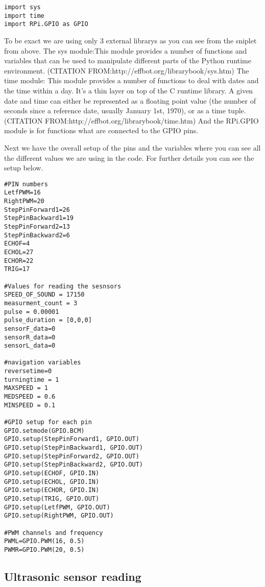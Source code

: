 \begin{lstlisting}
import sys
import time
import RPi.GPIO as GPIO
\end{lstlisting}

To be exact we are using only 3 external librarys as you can see from the sniplet from above.
The sys module:This module provides a number of functions and variables that can be used to manipulate different parts of the Python runtime environment.
(CITATION FROM:http://effbot.org/librarybook/sys.htm)
The time module: This module provides a number of functions to deal with dates and the time within a day. It’s a thin layer on top of the C runtime library.
A given date and time can either be represented as a floating point value (the number of seconds since a reference date, usually January 1st, 1970), or as a time tuple.
(CITATION FROM:http://effbot.org/librarybook/time.htm)
And the RPi.GPIO module is for functions what are connected to the GPIO pins.

Next we have the overall setup of the pins and the variables where you can see all the different values we are using in the code.
For further details you can see the setup below.

\begin{lstlisting}
#PIN numbers
LetfPWM=16
RightPWM=20
StepPinForward1=26
StepPinBackward1=19
StepPinForward2=13
StepPinBackward2=6
ECHOF=4
ECHOL=27
ECHOR=22
TRIG=17

#Values for reading the sesnsors
SPEED_OF_SOUND = 17150
measurment_count = 3
pulse = 0.00001	
pulse_duration = [0,0,0]
sensorF_data=0
sensorR_data=0
sensorL_data=0

#navigation variables
reversetime=0
turningtime = 1
MAXSPEED = 1
MEDSPEED = 0.6
MINSPEED = 0.1

#GPIO setup for each pin 
GPIO.setmode(GPIO.BCM)
GPIO.setup(StepPinForward1, GPIO.OUT)
GPIO.setup(StepPinBackward1, GPIO.OUT)
GPIO.setup(StepPinForward2, GPIO.OUT)
GPIO.setup(StepPinBackward2, GPIO.OUT)
GPIO.setup(ECHOF, GPIO.IN)
GPIO.setup(ECHOL, GPIO.IN)
GPIO.setup(ECHOR, GPIO.IN)
GPIO.setup(TRIG, GPIO.OUT)
GPIO.setup(LetfPWM, GPIO.OUT)
GPIO.setup(RightPWM, GPIO.OUT)

#PWM channels and frequency
PWML=GPIO.PWM(16, 0.5)
PWMR=GPIO.PWM(20, 0.5)
\end{lstlisting}

\subsection{Ultrasonic sensor reading}

